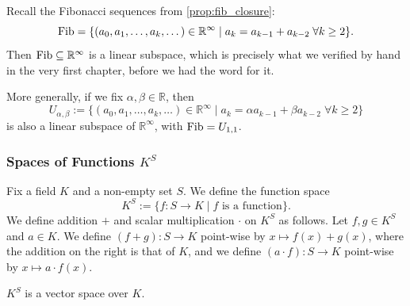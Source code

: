 \begin{example}
\label{ex:fib_subspace}
Recall the Fibonacci sequences from \cref{prop:fib_closure}:
\[
\operatorname{Fib} = \{(a_0, a_1, \dots, a_k, \dots) \in \mathbb{R}^\infty \mid a_k = a_{k-1} + a_{k-2} \; \forall k \ge 2\}.
\]
Then $\operatorname{Fib} \subseteq \mathbb{R}^\infty$ is a linear subspace, which is precisely what we verified by hand in the very first chapter, before we had the word for it.

More generally, if we fix $\alpha, \beta \in \mathbb{R}$, then
\[
U_{\alpha, \beta} := \{(a_0, a_1, \dots, a_k, \dots) \in \mathbb{R}^\infty \mid a_k = \alpha a_{k-1} + \beta a_{k-2} \; \forall k \ge 2\}
\]
is also a linear subspace of $\mathbb{R}^\infty$, with $\operatorname{Fib} = U_{1,1}$.
\end{example}

\subsubsection{Spaces of Functions \texorpdfstring{$K^S$}{K to the S}}

\begin{example}
\label{ex:function_space}
Fix a field $K$ and a non-empty set $S$. We define the function space
\[
K^S := \{f \colon S \to K \mid f \text{ is a function}\}.
\]
We define addition $+$ and scalar multiplication $\cdot$ on $K^S$ as follows. Let $f, g \in K^S$ and $a \in K$. We define $(f + g) \colon S \to K$ point-wise by $x \mapsto f(x) + g(x)$, where the addition on the right is that of $K$, and we define $(a \cdot f) \colon S \to K$ point-wise by $x \mapsto a \cdot f(x)$.
\end{example}

\begin{exercise}
\label{exc:function_space_axioms}
$K^S$ is a vector space over $K$.
\end{exercise}

